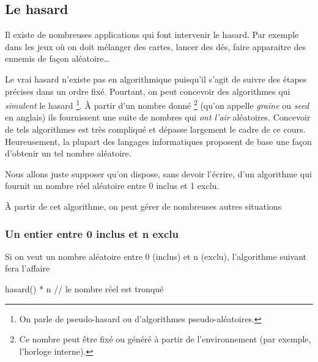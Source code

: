 		\subsection{Le hasard}
			
			Il existe de nombreuses applications 
			qui font intervenir le hasard.
			Par exemple dans les jeux où on doit mélanger des cartes,
			lancer des dés, 
			faire apparaitre des ennemis de façon aléatoire\dots
			
			Le vrai hasard n’existe pas en algorithmique
			puisqu’il s’agit de suivre des étapes précises
			dans un ordre fixé.
			Pourtant, on peut concevoir des algorithmes
			qui \emph{simulent} le hasard%
			\footnote{%
				On parle de pseudo-hasard
				ou d’algorithmes pseudo-aléatoires.
			}.
			À partir d’un nombre donné%
			\footnote{%
				Ce nombre peut être fixé ou généré à partir
				de l’environnement 
				(par exemple, l’horloge interne).
			}
			(qu’on appelle \emph{graine} ou \emph{seed} en anglais)
			ils fournissent une suite de nombres qui \emph{ont l’air}
			aléatoires.			
			Concevoir de tels algorithmes est très compliqué
			et dépasse largement le cadre de ce cours.
			Heureusement, la plupart des langages informatiques proposent de base
			une façon d'obtenir un tel nombre aléatoire.

			Nous allons juste supposer qu’on dispose,
			sans devoir l’écrire,
			d’un algorithme qui fournit un nombre réel aléatoire entre 0 inclus et 1 exclu.

			\begin{center}
			\end{center}
			
			À partir de cet algorithme,
			on peut gérer de nombreuses autres situations

\clearpage
			\subsubsection{Un entier entre 0 inclus et n exclu}
			
				Si on veut un nombre aléatoire entre 0 (inclus) et n (exclu),
				l'algorithme suivant fera l'affaire

				\begin{LDA}
					\Return hasard() * n		// le nombre réel est tronqué
					\EndAlgo
				\end{LDA}
				

